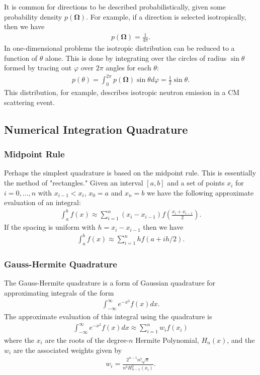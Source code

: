 \documentclass[11pt]{article}
\renewcommand\vec{\mathbf}
\begin{document}
It is common for directions to be described probabilistically, given some probability density \(p\left(\vec{\Omega}\right)\).  For example, if a direction is selected isotropically, then we have
\begin{align}
  p\left(\vec{\Omega}\right) = \frac{1}{4\pi}.
\end{align}
In one-dimensional problems the isotropic distribution can be reduced to a function of \(\theta\) alone.  This is done by integrating over the circles of radius \(\sin\theta\) formed by tracing out \(\varphi\) over \(2\pi\) angles for each \(\theta\):
\begin{align}
  p(\theta) = \int_0^{2\pi} p\left(\vec{\Omega}\right) \sin\theta d\varphi
            = \frac{1}{2} \sin\theta.
\end{align}
This distribution, for example, describes isotropic neutron emission in a CM scattering event.

\subsection{Numerical Integration Quadrature}
\label{sec:orgheadline71}
\subsubsection{Midpoint Rule}
\label{sec:orgheadline69}
Perhaps the simplest quadrature is based on the midpoint rule.  This is essentially the method of "rectangles."  Given an interval \([a,b]\) and a set of points \(x_i\) for \(i=0,\hdots,n\) with \(x_{i-1} < x_i\), \(x_0 = a\) and \(x_n = b\) we have the following approximate evaluation of an integral:
\begin{align}
  \int_a^b f(x) \approx \sum_{i=1}^n \left( x_i - x_{i-1} \right) f\left(\frac{x_i+x_{i-1}}{2}\right).
\end{align}
If the spacing is uniform with \(h = x_i - x_{i-1}\) then we have
\begin{align}
  \int_a^b f(x) \approx \sum_{i=1}^n h f\left(a + ih/2\right).
\end{align}
\subsubsection{Gauss-Hermite Quadrature}
\label{sec:orgheadline70}
The Gauss-Hermite quadrature is a form of Gaussian quadrature for approximating integrals of the form
\begin{align}
  \int_{-\infty}^\infty e^{-x^2} f(x) dx.
\end{align}
The approximate evaluation of this integral using the quadrature is
\begin{align}
  \int_{-\infty}^\infty e^{-x^2} f(x) dx \approx \sum_{i=1}^n w_i f(x_i)
\end{align}
where the \(x_i\) are the roots of the degree-\(n\) Hermite Polynomial, \(H_n(x)\), and the \(w_i\) are the associated weights given by
\begin{align}
  w_i = \frac{2^{n-1} n! \sqrt{\pi}}{n^2 H_{n-1}^2(x_i)}.
\end{align}
\end{document}
